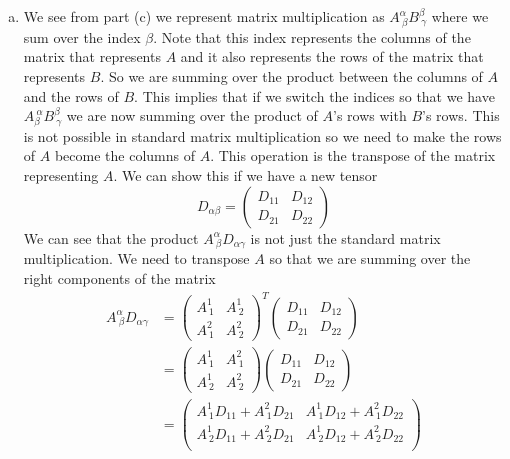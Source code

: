 \documentclass[11pt]{article}
\numberwithin{equation}{section}
\begin{document}
\begin{enumerate}[(a)]
\item
We see from part (c) we represent matrix multiplication as $A^{\alpha}_{\ \beta}B^{\beta}_{\ \gamma}$ where we sum over the index $\beta$. Note that this index represents the columns of the matrix that represents $A$ and it also represents the rows of the matrix that represents $B$. So we are summing over the product between the columns of $A$ and the rows of $B$. This implies that if we switch the indices so that we have $A^{\ \alpha}_{\beta}B^{\beta}_{\ \gamma}$ we are now summing over the product of $A$'s rows with $B$'s rows. This is not possible in standard matrix multiplication so we need to make the rows of $A$ become the columns of $A$. This operation is the transpose of the matrix representing $A$. We can show this if we have a new tensor 
$$D_{\alpha\beta} = \left(\begin{array}{cc}
			D_{11} &D_{12}\\
			D_{21} &D_{22}
			\end{array}\right)$$
We can see that the product $A^{\alpha}_{\ \beta}D_{\alpha\gamma}$ is not just the standard matrix multiplication. We need to transpose $A$ so that we are summing over the right components of the matrix
\begin{align*}
A^{\alpha}_{\ \beta}D_{\alpha\gamma} &= \left(\begin{array}{cc}
						A^1_{\ 1} &A^1_{\ 2}\\
						A^2_{\ 1} &A^2_{\ 2}
					\end{array}\right)^T
					\left(\begin{array}{cc}
						D_{11} &D_{12}\\
						D_{21} &D_{22}
					\end{array}\right)\\
&= \left(\begin{array}{cc}
	A^1_{\ 1} &A^2_{\ 1}\\
	A^1_{\ 2} &A^2_{\ 2}
	\end{array}\right)
	\left(\begin{array}{cc}
	D_{11} &D_{12}\\
	D_{21} &D_{22}
	\end{array}\right)\\
&= \left(\begin{array}{cc}
	A^1_{\ 1}D_{11} + A^2_{\ 1}D_{21}	&A^1_{\ 1}D_{12} + A^2_{\ 1}D_{22}\\
	A^1_{\ 2}D_{11} + A^2_{\ 2}D_{21}	&A^1_{\ 2}D_{12} + A^2_{\ 2}D_{22}\\
	\end{array}\right)

\end{align*}
\end{enumerate}
\end{document}
